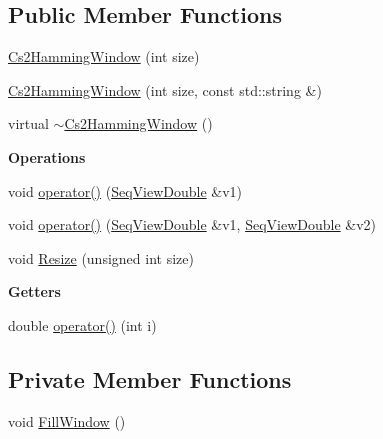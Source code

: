 \subsection*{Public Member Functions}
\begin{DoxyCompactItemize}
\item 
\hyperlink{classtsa_1_1_cs2_hamming_window_a4ae0ec8d18145afbc446edef40842cf4}{Cs2\+Hamming\+Window} (int size)
\item 
\hyperlink{classtsa_1_1_cs2_hamming_window_a3f342ff907141da428f5e4255dd7763f}{Cs2\+Hamming\+Window} (int size, const std\+::string \&)
\item 
virtual \hyperlink{classtsa_1_1_cs2_hamming_window_a42a7009a9fc8e56f2508cd7d7f563fa3}{$\sim$\+Cs2\+Hamming\+Window} ()
\end{DoxyCompactItemize}
\begin{Indent}\textbf{ Operations}\par
\begin{DoxyCompactItemize}
\item 
void \hyperlink{classtsa_1_1_cs2_hamming_window_a41281794f2587c56ed52459fe0a106a2}{operator()} (\hyperlink{namespacetsa_ac599574bcc094eda25613724b8f3ca9e}{Seq\+View\+Double} \&v1)
\item 
void \hyperlink{classtsa_1_1_cs2_hamming_window_a98046f7488d9126a9041b16852491dd9}{operator()} (\hyperlink{namespacetsa_ac599574bcc094eda25613724b8f3ca9e}{Seq\+View\+Double} \&v1, \hyperlink{namespacetsa_ac599574bcc094eda25613724b8f3ca9e}{Seq\+View\+Double} \&v2)
\item 
void \hyperlink{classtsa_1_1_cs2_hamming_window_aa455906419c91055a59da8381c3a7588}{Resize} (unsigned int size)
\end{DoxyCompactItemize}
\end{Indent}
\begin{Indent}\textbf{ Getters}\par
\begin{DoxyCompactItemize}
\item 
double \hyperlink{classtsa_1_1_cs2_hamming_window_ae5b59c5596e560ad3a09c7d2633ac729}{operator()} (int i)
\end{DoxyCompactItemize}
\end{Indent}
\subsection*{Private Member Functions}
\begin{DoxyCompactItemize}
\item 
void \hyperlink{classtsa_1_1_cs2_hamming_window_a269a092db403a2bd7bb93456dc39be60}{Fill\+Window} ()
\end{DoxyCompactItemize}
